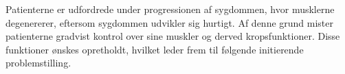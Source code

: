 Patienterne er udfordrede under progressionen af sygdommen, hvor musklerne degenererer, eftersom sygdommen udvikler sig hurtigt. Af denne grund mister patienterne gradvist kontrol over sine muskler og derved kropsfunktioner. Disse funktioner ønskes opretholdt, hvilket leder frem til følgende initierende problemstilling. 
 
